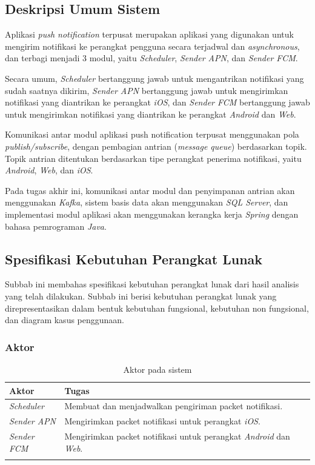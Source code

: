 \subsection{Deskripsi Umum Sistem}
Aplikasi \textit{push notification} terpusat merupakan aplikasi yang digunakan untuk mengirim notifikasi ke perangkat pengguna secara terjadwal dan \textit{asynchronous}, dan terbagi menjadi 3 modul, yaitu \textit{Scheduler}, \textit{Sender APN}, dan \textit{Sender FCM}.
\par Secara umum, \textit{Scheduler} bertanggung jawab untuk mengantrikan notifikasi yang sudah saatnya dikirim, \textit{Sender APN} bertanggung jawab untuk mengirimkan notifikasi yang diantrikan ke perangkat \textit{iOS}, dan \textit{Sender FCM} bertanggung jawab untuk mengirimkan notifikasi yang diantrikan ke perangkat \textit{Android} dan \textit{Web}.
\par Komunikasi antar modul aplikasi push notification terpusat menggunakan pola \textit{publish/subscribe}, dengan pembagian antrian (\textit{message queue}) berdasarkan topik.
Topik antrian ditentukan berdasarkan tipe perangkat penerima notifikasi, yaitu \textit{Android}, \textit{Web}, dan \textit{iOS}.
\par Pada tugas akhir ini, komunikasi antar modul dan penyimpanan antrian akan menggunakan \textit{Kafka}, sistem basis data akan menggunakan \textit{SQL Server}, dan implementasi modul aplikasi akan menggunakan kerangka kerja \textit{Spring} dengan bahasa pemrograman \textit{Java}.

\subsection{Spesifikasi Kebutuhan Perangkat Lunak}
Subbab ini membahas spesifikasi kebutuhan perangkat lunak dari hasil analisis yang telah dilakukan.
Subbab ini berisi kebutuhan perangkat lunak yang direpresentasikan dalam bentuk kebutuhan fungsional, kebutuhan non fungsional, dan diagram kasus penggunaan.

\subsubsection{Aktor}
\begin{longtable}{|p{2cm}|p{6cm}|}
    \hline
    \textbf{Aktor} & \textbf{Tugas} \\ \hline
    \textit{Scheduler} & Membuat dan menjadwalkan pengiriman packet notifikasi. \\ \hline
    \textit{Sender APN} & Mengirimkan packet notifikasi untuk perangkat \textit{iOS}. \\ \hline
    \textit{Sender FCM} & Mengirimkan packet notifikasi untuk perangkat \textit{Android} dan \textit{Web}. \\ \hline
    \caption{Aktor pada sistem}
\end{longtable}

